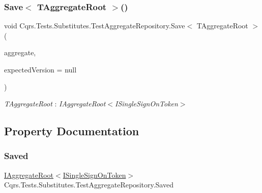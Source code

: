 \subsubsection{\texorpdfstring{Save$<$ T\+Aggregate\+Root $>$()}{Save< TAggregateRoot >()}}
{\footnotesize\ttfamily void Cqrs.\+Tests.\+Substitutes.\+Test\+Aggregate\+Repository.\+Save$<$ T\+Aggregate\+Root $>$ (\begin{DoxyParamCaption}\item[{T\+Aggregate\+Root}]{aggregate,  }\item[{int?}]{expected\+Version = {\ttfamily null} }\end{DoxyParamCaption})}

\begin{Desc}
\item[Type Constraints]\begin{description}
\item[{\em T\+Aggregate\+Root} : {\em I\+Aggregate\+Root$<$I\+Single\+Sign\+On\+Token$>$}]\end{description}
\end{Desc}


\subsection{Property Documentation}
\mbox{\label{classCqrs_1_1Tests_1_1Substitutes_1_1TestAggregateRepository_a5dae460d63c66ee005d2c11eb228388f}} 
\subsubsection{\texorpdfstring{Saved}{Saved}}
{\footnotesize\ttfamily \hyperlink{interfaceCqrs_1_1Domain_1_1IAggregateRoot}{I\+Aggregate\+Root}$<$\hyperlink{interfaceCqrs_1_1Authentication_1_1ISingleSignOnToken}{I\+Single\+Sign\+On\+Token}$>$ Cqrs.\+Tests.\+Substitutes.\+Test\+Aggregate\+Repository.\+Saved\hspace{0.3cm}{\ttfamily [get]}}

